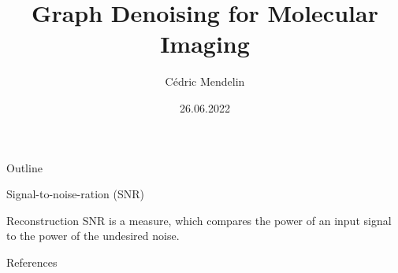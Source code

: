 \documentclass[aspectratio=169]{beamer}
\title              {Graph Denoising for Molecular Imaging}
\author     		{Cédric Mendelin}
\institute          {Department of Mathematics and Computer Science, University of Basel}
\date               {26.06.2022}
\begin{document}

\begin{frame}[t,plain]
    \titlepage
\end{frame}

\begin{frame}[t]{Outline}
    \tableofcontents
\end{frame}



\begin{frame}{Signal-to-noise-ration (SNR)}
    
    \begin{block}{Reconstruction}
        SNR is a measure, which compares the power of an input signal to the power of the undesired noise.
    \end{block}

\end{frame}











\backupbegin

\begin{frame}{References}
    \printbibliography
\end{frame}

\backupend
\end{document}

